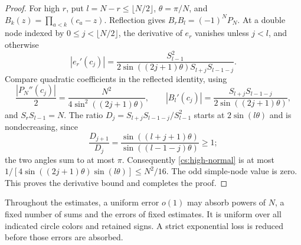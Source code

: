 \begin{proof}
For high \(r\), put \(l=N-r\le\lfloor N/2\rfloor\),
\(\theta=\pi/N\), and \(B_k(z)=\prod_{a<k}(c_a-z)\).
Reflection gives \(B_rB_l=(-1)^NP_N\). At a double node indexed by
\(0\le j<\lfloor N/2\rfloor\), the derivative of \(e_r\) vanishes
unless \(j<l\), and otherwise
\begin{equation}\label{cs:high-normal}
 |e_r'(c_j)|=
 \frac{S_{l-1}^2}
 {2\sin((2j+1)\theta)S_{l+j}S_{l-1-j}}.
\end{equation}
Compare quadratic coefficients in the reflected identity, using
\[
 \frac{|P_N''(c_j)|}{2}=\frac{N^2}{4\sin^2((2j+1)\theta)},\qquad
 |B_l'(c_j)|=\frac{S_{l+j}S_{l-1-j}}{2\sin((2j+1)\theta)},
\]
and \(S_rS_{l-1}=N\). The ratio
\(D_j=S_{l+j}S_{l-1-j}/S_{l-1}^2\) starts at \(2\sin(l\theta)\)
and is nondecreasing, since
\[
 \frac{D_{j+1}}{D_j}
 =\frac{\sin((l+j+1)\theta)}{\sin((l-1-j)\theta)}\ge1;
\]
the two angles sum to at most \(\pi\). Consequently
\eqref{cs:high-normal} is at most
\(1/[4\sin((2j+1)\theta)\sin(l\theta)]\le N^2/16\).
The odd simple-node value is zero. This proves the derivative bound and completes the proof.
\end{proof}

Throughout the estimates, a uniform error \(o(1)\) may absorb powers
of \(N\), a fixed number of sums and the errors of fixed estimates.
It is uniform over all indicated circle colors and retained signs.
A strict exponential loss is reduced before those errors are absorbed.
